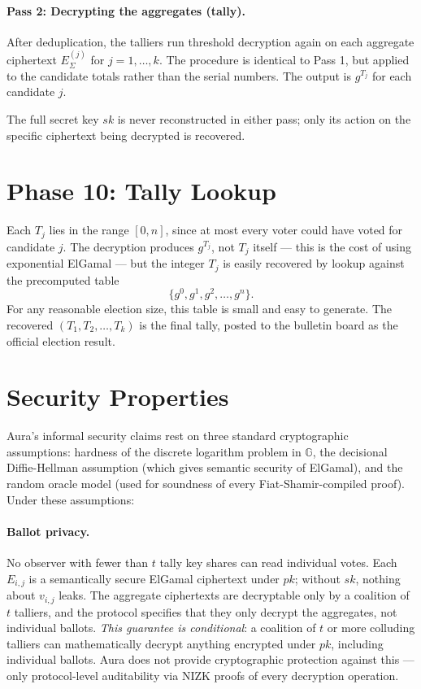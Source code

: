 \documentclass[12pt,a4paper,oneside]{report}
\begin{document}
\paragraph{Pass 2: Decrypting the aggregates (tally).}
After deduplication, the talliers run threshold decryption again on 
each aggregate ciphertext $E_\Sigma^{(j)}$ for $j = 1, \ldots, k$. 
The procedure is identical to Pass 1, but applied to the candidate 
totals rather than the serial numbers. The output is $g^{T_j}$ for 
each candidate $j$.

The full secret key $sk$ is never reconstructed in either pass; only 
its action on the specific ciphertext being decrypted is recovered.

\section{Phase 10: Tally Lookup}
\label{sec:phase-10-lookup}

Each $T_j$ lies in the range $[0, n]$, since at most every voter could 
have voted for candidate $j$. The decryption produces $g^{T_j}$, not 
$T_j$ itself --- this is the cost of using exponential ElGamal --- but 
the integer $T_j$ is easily recovered by lookup against the precomputed 
table
\[
    \{g^0, g^1, g^2, \ldots, g^n\}.
\]
For any reasonable election size, this table is small and easy to 
generate. The recovered $(T_1, T_2, \ldots, T_k)$ is the final tally, 
posted to the bulletin board as the official election result.

\section{Security Properties}
\label{sec:aura-security}

Aura's informal security claims rest on three standard cryptographic 
assumptions: hardness of the discrete logarithm problem in $\mathbb{G}$, 
the decisional Diffie-Hellman assumption (which gives semantic security 
of ElGamal), and the random oracle model (used for soundness of every 
Fiat-Shamir-compiled proof). Under these assumptions:

\paragraph{Ballot privacy.}
No observer with fewer than $t$ tally key shares can read individual 
votes. Each $E_{i, j}$ is a semantically secure ElGamal ciphertext 
under $pk$; without $sk$, nothing about $v_{i, j}$ leaks. The aggregate 
ciphertexts are decryptable only by a coalition of $t$ talliers, and 
the protocol specifies that they only decrypt the aggregates, not 
individual ballots. \textit{This guarantee is conditional}: a coalition 
of $t$ or more colluding talliers can mathematically decrypt anything 
encrypted under $pk$, including individual ballots. Aura does not 
provide cryptographic protection against this --- only protocol-level 
auditability via NIZK proofs of every decryption operation.
\end{document}
